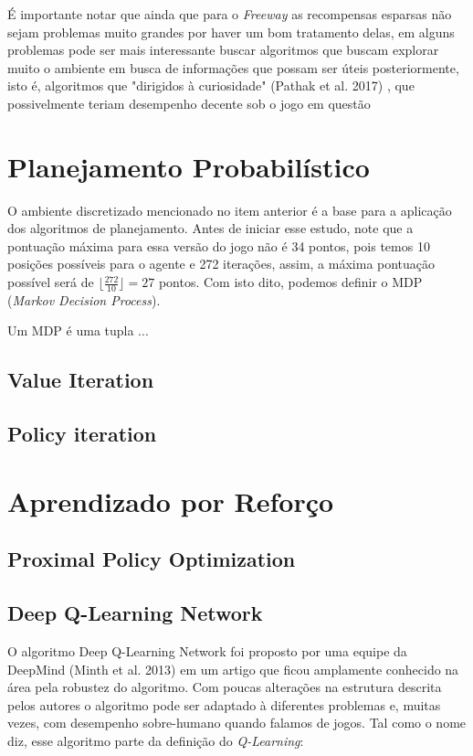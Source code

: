 \documentclass[letterpaper]{article} %
\begin{document}
É importante notar que ainda que para o \textit{Freeway} as recompensas esparsas não sejam problemas muito grandes por haver um bom tratamento delas, em alguns problemas pode ser mais interessante buscar algoritmos que buscam explorar muito o ambiente em busca de informações que possam ser úteis posteriormente, isto é, algoritmos que "dirigidos à curiosidade" (Pathak et al. 2017) , que possivelmente teriam desempenho decente sob o jogo em questão 


\section{Planejamento Probabilístico}
O ambiente discretizado mencionado no item anterior é a base para a aplicação dos algoritmos de planejamento. Antes de iniciar esse estudo, note que a pontuação máxima para essa versão do jogo não é 34 pontos, pois temos 10 posições possíveis para o agente e 272 iterações, assim, a máxima pontuação possível será de $\lfloor \frac{272}{10}\rfloor = 27$ pontos. Com isto dito, podemos definir o MDP (\textit{Markov Decision Process}).

Um MDP é uma tupla ...


\subsection{Value Iteration}

\subsection{Policy iteration}

\section{Aprendizado por Reforço}

\subsection{Proximal Policy Optimization}



\subsection{Deep Q-Learning Network}
O algoritmo Deep Q-Learning Network foi proposto por uma equipe da DeepMind (Minth et al. 2013) em um artigo que ficou amplamente conhecido na área pela robustez do algoritmo. Com poucas alterações na estrutura descrita pelos autores o algoritmo pode ser adaptado à diferentes problemas e, muitas vezes, com desempenho sobre-humano quando falamos de jogos. Tal como o nome diz, esse algoritmo parte da definição do \textit{Q-Learning}:
\end{document}

